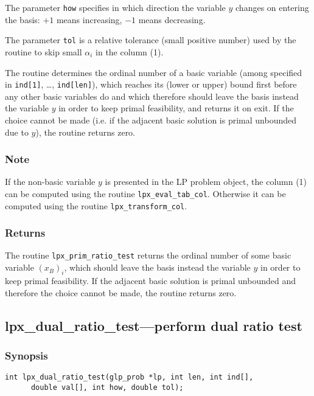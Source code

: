 The parameter \verb|how| specifies in which direction the variable $y$
changes on entering the basis: $+1$ means increasing, $-1$ means
decreasing.

The parameter \verb|tol| is a relative tolerance (small positive number)
used by the routine to skip small $\alpha_i$ in the column (1).

The routine determines the ordinal number of a basic variable
(among specified in \verb|ind[1]|, \dots, \verb|ind[len]|), which
reaches its (lower or upper) bound first before any other basic
variables do and which therefore should leave the basis instead the
variable $y$ in order to keep primal feasibility, and returns it on
exit. If the choice cannot be made (i.e. if the adjacent basic solution
is primal unbounded due to $y$), the routine returns zero.

\subsubsection*{Note}

If the non-basic variable $y$ is presented in the LP problem object, the
column (1) can be computed using the routine \verb|lpx_eval_tab_col|.
Otherwise it can be computed using the routine \verb|lpx_transform_col|.

\subsubsection*{Returns}

The routine \verb|lpx_prim_ratio_test| returns the ordinal number of
some basic variable $(x_B)_i$, which should leave the basis instead the
variable $y$ in order to keep primal feasibility. If the adjacent basic
solution is primal unbounded and therefore the choice cannot be made,
the routine returns zero.

\subsection{lpx\_dual\_ratio\_test---perform dual ratio test}

\subsubsection*{Synopsis}

\begin{verbatim}
int lpx_dual_ratio_test(glp_prob *lp, int len, int ind[],
      double val[], int how, double tol);
\end{verbatim}


